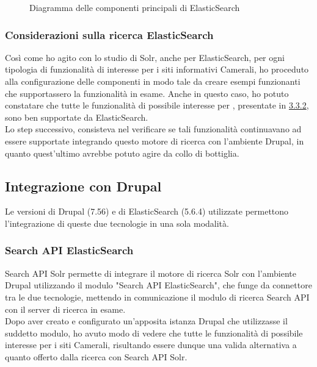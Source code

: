 			\begin{figure}[p]
				\caption{Diagramma delle componenti principali di ElasticSearch}
			\end{figure}
			
			\subsubsection{Considerazioni sulla ricerca ElasticSearch}
			Così come ho agito con lo studio di \gls{Solr}, anche per \gls{ElasticSearch}, per ogni tipologia di funzionalità di interesse per i siti informativi Camerali, ho proceduto alla configurazione delle componenti in modo tale da creare esempi funzionanti che supportassero la funzionalità in esame. Anche in questo caso, ho potuto constatare che tutte le funzionalità di possibile interesse per \nomeAzienda, presentate in \hyperref[sub:possibile_evoluzione]{3.3.2}, sono ben supportate da \gls{ElasticSearch}. \\
			Lo step successivo, consisteva nel verificare se tali funzionalità continuavano ad essere supportate integrando questo motore di ricerca con l'ambiente \gls{Drupal}, in quanto quest'ultimo avrebbe potuto agire da collo di bottiglia.
		
		\subsection{Integrazione con Drupal}
		Le versioni di \gls{Drupal} (7.56) e di \gls{ElasticSearch} (5.6.4) utilizzate permettono l'integrazione di queste due tecnologie in una sola modalità.
		
			\subsubsection{Search API ElasticSearch}
			Search API Solr permette di integrare il motore di ricerca \gls{Solr} con l'ambiente \gls{Drupal} utilizzando il modulo "Search API ElasticSearch", che funge da connettore tra le due tecnologie, mettendo in comunicazione il modulo di ricerca \gls{Search API} con il server di ricerca in esame. \\
			Dopo aver creato e configurato un'apposita istanza \gls{Drupal} che utilizzasse il suddetto modulo, ho avuto modo di vedere che tutte le funzionalità di possibile interesse per i siti Camerali, risultando essere dunque una valida alternativa a quanto offerto dalla ricerca con Search API Solr.

